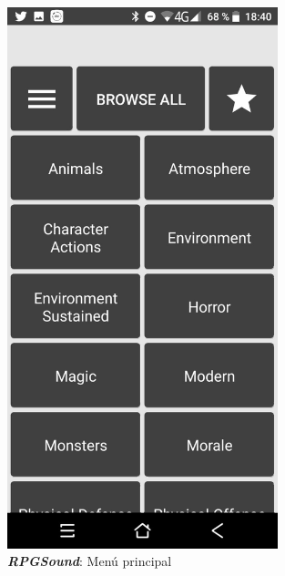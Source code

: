 \begin{figure}[H]
    \centering
    \begin{minipage}{0.3\textwidth}
        \centering
        \includegraphics[width=0.7\textwidth]{Images/RPGSound_1.jpeg}
        \caption{\textit{\textbf{RPGSound}}: Menú principal}
        

\end{minipage}
\end{figure}
